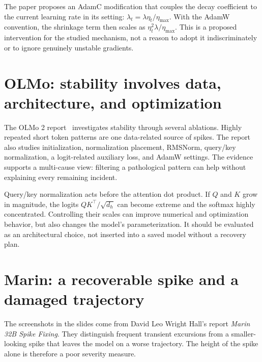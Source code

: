The paper proposes an AdamC modification that couples the decay coefficient to the current learning rate in its setting: $\lambda_t=\lambda\eta_t/\eta_{\max}$. With the AdamW convention, the shrinkage term then scales as $\eta_t^2\lambda/\eta_{\max}$. This is a proposed intervention for the studied mechanism, not a reason to adopt it indiscriminately or to ignore genuinely unstable gradients.


\section{OLMo: stability involves data, architecture, and optimization}

The OLMo 2 report~\cite{olmo2} investigates stability through several ablations. Highly repeated short token patterns are one data-related source of spikes. The report also studies initialization, normalization placement, RMSNorm, query/key normalization, a logit-related auxiliary loss, and AdamW settings. The evidence supports a multi-cause view: filtering a pathological pattern can help without explaining every remaining incident.

Query/key normalization acts before the attention dot product. If $Q$ and $K$ grow in magnitude, the logits $QK^\top/\sqrt{d_h}$ can become extreme and the softmax highly concentrated. Controlling their scales can improve numerical and optimization behavior, but also changes the model's parameterization. It should be evaluated as an architectural choice, not inserted into a saved model without a recovery plan.

\section{Marin: a recoverable spike and a damaged trajectory}
The screenshots in the slides come from David Leo Wright Hall's report \emph{Marin 32B Spike Fixing}. They distinguish frequent transient excursions from a smaller-looking spike that leaves the model on a worse trajectory. The height of the spike alone is therefore a poor severity measure.

